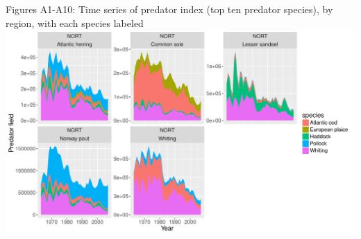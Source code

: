 \documentclass[12pt]{article}
\begin{document}
\appendix
\section{}
Figures A1-A10: Time series of predator index (top ten predator species), by region,
with each species labeled
\\
\includegraphics[page=1, width=\textwidth]{pred-index-by-region.pdf}

\end{document}
